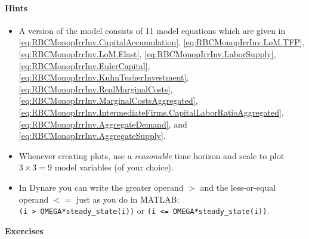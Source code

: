 \documentclass[a4paper]{scrartcl}
\begin{document}
\paragraph{Hints}

\begin{itemize}
\item
A version of the model consists of 11 model equations which are given in
{\eqref{eq:RBCMonopIrrInv.CapitalAccumulation}},
{\eqref{eq:RBCMonopIrrInv.LoM.TFP}},
{\eqref{eq:RBCMonopIrrInv.LoM.Elast}},
{\eqref{eq:RBCMonopIrrInv.LaborSupply}},
{\eqref{eq:RBCMonopIrrInv.EulerCapital}},
{\eqref{eq:RBCMonopIrrInv.KuhnTuckerInvestment}},
{\eqref{eq:RBCMonopIrrInv.RealMarginalCosts}},
{\eqref{eq:RBCMonopIrrInv.MarginalCostsAggregated}},
{\eqref{eq:RBCMonopIrrInv.IntermediateFirms.CapitalLaborRatioAggregated}},
{\eqref{eq:RBCMonopIrrInv.AggregateDemand}}, and
{\eqref{eq:RBCMonopIrrInv.AggregateSupply}}.

\item
Whenever creating plots, use a \emph{reasonable} time horizon
and scale to plot \(3 \times 3=9\) model variables (of your choice).

\item
In Dynare you can write the greater operand \(>\) and the less-or-equal operand \(<=\) just as you do in MATLAB:\\
\texttt{(i > OMEGA*steady{\_}state{(i)})} or \texttt{(i <= OMEGA*steady{\_}state{(i)})}.
\end{itemize}

\bigskip

\begin{center} \Large \textbf{Exercises} \end{center}
\end{document}
